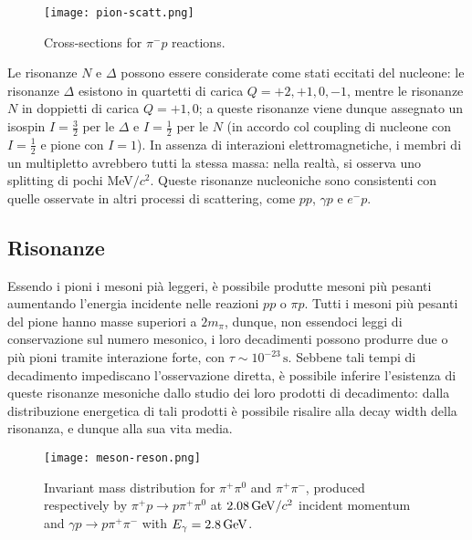 \begin{figure}[!hb]
	\centering
	\texttt{[image: pion-scatt.png]}
	\caption{Cross-sections for $ \pi^- p $ reactions.}
	\label{pion-scatt}
\end{figure}

Le risonanze $ N $ e $ \Delta $ possono essere considerate come stati eccitati del nucleone: le risonanze $ \Delta $ esistono in quartetti di carica $ Q = +2,+1,0,-1 $, mentre le risonanze $ N $ in doppietti di carica $ Q = +1,0 $; a queste risonanze viene dunque assegnato un isospin $ I = \frac{3}{2} $ per le $ \Delta $ e $ I = \frac{1}{2} $ per le $ N $ (in accordo col coupling di nucleone con $ I = \frac{1}{2} $ e pione con $ I = 1 $). In assenza di interazioni elettromagnetiche, i membri di un multipletto avrebbero tutti la stessa massa: nella realtà, si osserva uno splitting di pochi MeV$ /c^2 $. Queste risonanze nucleoniche sono consistenti con quelle osservate in altri processi di scattering, come $ pp $, $ \gamma p $ e $ e^- p $.

\subsection{Risonanze}

Essendo i pioni i mesoni pià leggeri, è possibile produtte mesoni più pesanti aumentando l'energia incidente nelle reazioni $ pp $ o $ \pi p $. Tutti i mesoni più pesanti del pione hanno masse superiori a $ 2m_{\pi} $, dunque, non essendoci leggi di conservazione sul numero mesonico, i loro decadimenti possono produrre due o più pioni tramite interazione forte, con $ \tau \sim 10^{-23}\,\text{s} $. Sebbene tali tempi di decadimento impediscano l'osservazione diretta, è possibile inferire l'esistenza di queste risonanze mesoniche dallo studio dei loro prodotti di decadimento: dalla distribuzione energetica di tali prodotti è possibile risalire alla decay width della risonanza, e dunque alla sua vita media.

\begin{figure}[!h]
	\centering
	\texttt{[image: meson-reson.png]}
	\caption{Invariant mass distribution for $ \pi^+ \pi^0 $ and $ \pi^+ \pi^- $, produced respectively by $ \pi^+ p \rightarrow p \pi^+ \pi^0 $ at $ 2.08\,\mathrm{GeV}/c^2 $ incident momentum and $ \gamma p \rightarrow p \pi^+ \pi^- $ with $ E_{\gamma} = 2.8\,\mathrm{GeV} $.}
	\label{meson-reson}
\end{figure}

